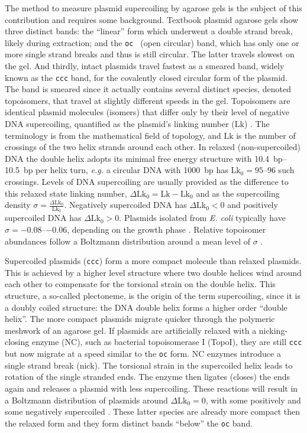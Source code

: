 \documentclass[10pt,a4]{article}
\def\cite#1{\hypersetup{citecolor=Teal}\citep{#1}} %
\newcommand{\lk}{\ensuremath{\text{Lk}}}
\newcommand{\lkr}{\ensuremath{\text{Lk}_0}}
\newcommand{\dlkr}{\ensuremath{\Delta\text{Lk}_0}}
\newcommand{\eg}{\textit{e.g.}}
\begin{document}
The method to measure plasmid supercoiling by agarose gels is the
subject of this contribution and requires some background.  Textbook
plasmid agarose gels show three distinct bands: the ``linear'' form
which underwent a double strand break, likely during extraction; and
the \texttt{oc } (open circular) band, which has only one or more
single strand breaks and thus is still circular. The latter travels
slowest on the gel. And thirdly, intact plasmids travel fastest as a
smeared band, widely known as the \texttt{ccc} band, for the
covalently closed circular form of the plasmid. The band is smeared
since it actually contains several distinct species, denoted
topoisomers, that travel at slightly different speeds in the gel.
%
Topoisomers are identical plasmid molecules (isomers) that differ only
by their level of negative DNA supercoiling, quantified as the
plasmid's linking number (\lk{}) \cite{Crick1976}. The terminology is
from the mathematical field of topology, and \lk{} is the number of
crossings of the two helix strands around each other.  In relaxed
(non-supercoiled) DNA the double helix adopts its minimal free energy
structure with \SIrange{10.4}{10.5}{bp} per helix turn, \eg{} a
circular DNA with \SI{1000}{bp} has $\lkr=\numrange{95}{96}$ such
crossings. Levels of DNA supercoiling are usually provided as the
difference to this relaxed state linking number, $\dlkr=\lk-\lkr$ and
as the supercoiling density $\sigma=\frac{\dlkr}{\lkr}$.  Negatively
supercoiled DNA has $\dlkr<0$ and positively supercoiled DNA has
$\dlkr>0$.  Plasmids isolated from \textit{E. coli} typically have
$\sigma=\numrange{-0.08}{-0.06}$, depending on the growth phase
\cite{Liu2018}. Relative topoisomer abundances follow a Boltzmann
distribution around a mean level of $\sigma$ \cite{Pulleyblank1975,
  Depew1975, Keller1975b}.

Supercoiled plasmids (\texttt{ccc}) form a more compact molecule than
relaxed plasmids. This is achieved by a higher level structure where
two double helices wind around each other to compensate for the
torsional strain on the double helix. This structure, a so-called
plectoneme, is the origin of the term supercoiling, since it is a
doubly coiled structure: the DNA double helix forms a higher order
``double helix''. The more compact plasmids migrate quicker through
the polymeric meshwork of an agarose gel.
%
If plasmids are artificially relaxed with a nicking-closing enzyme
(NC), such as bacterial topoisomerase I (TopoI), they are still
\texttt{ccc} but now migrate at a speed similar to the \texttt{oc}
form. NC enzymes introduce a single strand break (nick). The torsional
strain in the supercoiled helix leads to rotation of the single
stranded ends. The enzyme then ligates (closes) the ends again and
releases a plasmid with less supercoiling. These reactions will result
in a Boltzmann distribution of plasmids around $\dlkr=0$, with some
positively and some negatively supercoiled \cite{Depew1975}.  These
latter species are already more compact then the relaxed form and they
form distinct bands ``below'' the \texttt{oc} band.
\end{document}
